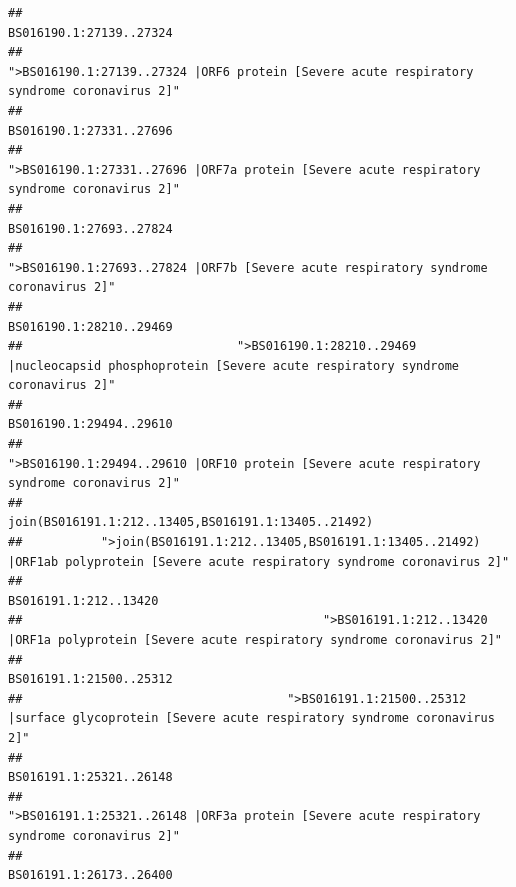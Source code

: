 \documentclass[
]{article}
\begin{document}
\begin{verbatim}
##                                                                                                                BS016190.1:27139..27324 
##                                             ">BS016190.1:27139..27324 |ORF6 protein [Severe acute respiratory syndrome coronavirus 2]" 
##                                                                                                                BS016190.1:27331..27696 
##                                            ">BS016190.1:27331..27696 |ORF7a protein [Severe acute respiratory syndrome coronavirus 2]" 
##                                                                                                                BS016190.1:27693..27824 
##                                                    ">BS016190.1:27693..27824 |ORF7b [Severe acute respiratory syndrome coronavirus 2]" 
##                                                                                                                BS016190.1:28210..29469 
##                              ">BS016190.1:28210..29469 |nucleocapsid phosphoprotein [Severe acute respiratory syndrome coronavirus 2]" 
##                                                                                                                BS016190.1:29494..29610 
##                                            ">BS016190.1:29494..29610 |ORF10 protein [Severe acute respiratory syndrome coronavirus 2]" 
##                                                                                    join(BS016191.1:212..13405,BS016191.1:13405..21492) 
##           ">join(BS016191.1:212..13405,BS016191.1:13405..21492) |ORF1ab polyprotein [Severe acute respiratory syndrome coronavirus 2]" 
##                                                                                                                  BS016191.1:212..13420 
##                                          ">BS016191.1:212..13420 |ORF1a polyprotein [Severe acute respiratory syndrome coronavirus 2]" 
##                                                                                                                BS016191.1:21500..25312 
##                                     ">BS016191.1:21500..25312 |surface glycoprotein [Severe acute respiratory syndrome coronavirus 2]" 
##                                                                                                                BS016191.1:25321..26148 
##                                            ">BS016191.1:25321..26148 |ORF3a protein [Severe acute respiratory syndrome coronavirus 2]" 
##                                                                                                                BS016191.1:26173..26400 

\end{verbatim}
\end{document}
